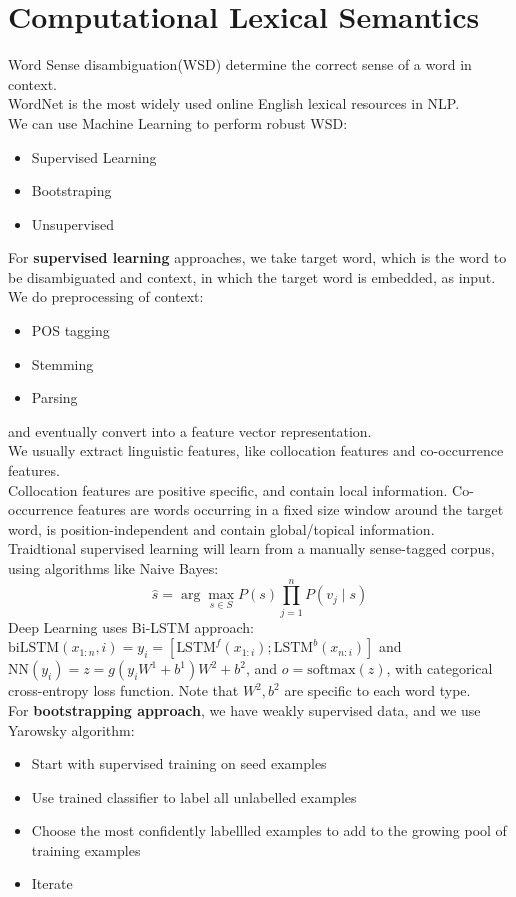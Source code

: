 \documentclass[12pt]{article}
\theoremstyle{definition}
\begin{document}
\section{Computational Lexical Semantics}
Word Sense disambiguation(WSD) determine the correct sense of a word in context.\\
WordNet is the most widely used online English lexical resources in NLP.\\
We can use Machine Learning to perform robust WSD:
\begin{itemize}
	\item Supervised Learning
	\item Bootstraping
	\item Unsupervised
\end{itemize}
For \textbf{supervised learning} approaches, we take target word, which is the word to be disambiguated and context, in which the target word is embedded, as input.\\
We do preprocessing of context:
\begin{itemize}
	\item POS tagging
	\item Stemming
	\item Parsing
\end{itemize}
and eventually convert into a feature vector representation.\\
We usually extract linguistic features, like collocation features and co-occurrence features.\\
Collocation features are positive specific, and contain local information. Co-occurrence features are words occurring in a fixed size window around the target word, is position-independent and contain global/topical information.\\
Traidtional supervised learning will learn from a manually sense-tagged corpus, using algorithms like Naive Bayes:
\[
\hat{s}=\arg\max_{s\in S}P(s)\prod_{j=1}^n P(v_j\mid s)
\]
Deep Learning uses Bi-LSTM approach: $\text{biLSTM}(x_{1:n}, i)=y_i=[\text{LSTM}^f(x_{1:i}); \text{LSTM}^b(x_{n:i})]$ and $\text{NN}(y_i)=z=g(y_iW^1+b^1)W^2+b^2$, and $o=\text{softmax}(z)$, with categorical cross-entropy loss function. Note that $W^2, b^2$ are specific to each word type.\\
For \textbf{bootstrapping approach}, we have weakly supervised data, and we use Yarowsky algorithm:
\begin{itemize}
	\item Start with supervised training on seed examples
	\item Use trained classifier to label all unlabelled examples
	\item Choose the most confidently labellled examples to add to the growing pool of training examples
	\item Iterate
\end{itemize}
\end{document}
